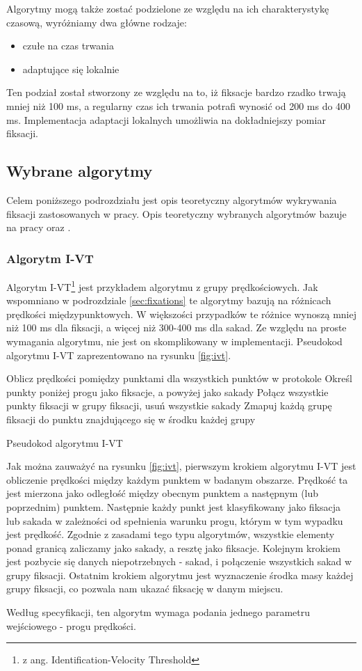 Algorytmy mogą także zostać podzielone ze względu na ich charakterystykę czasową, wyróżniamy dwa główne rodzaje:
\begin{itemize}
    \item czułe na czas trwania
    \item adaptujące się lokalnie
\end{itemize}
Ten podział został stworzony ze względu na to, iż fiksacje bardzo rzadko trwają mniej niż 100 ms, a regularny czas ich trwania potrafi wynosić od 200 ms do 400 ms. Implementacja adaptacji lokalnych umożliwia na dokładniejszy pomiar fiksacji.
\subsection{Wybrane algorytmy}
\label{ssec:algorithms}
Celem poniższego podrozdziału jest opis teoretyczny algorytmów wykrywania fiksacji zastosowanych w pracy. Opis teoretyczny wybranych algorytmów bazuje na pracy \cite{Main} oraz \cite{EvaluationMethodology}.
\subsubsection{Algorytm I-VT}
\label{ssec:ivt}
Algorytm I-VT\footnote{z ang. Identification-Velocity Threshold} jest przykładem algorytmu z grupy prędkościowych. Jak wspomniano w podrozdziale \ref{sec:fixations} te algorytmy bazują na różnicach prędkości międzypunktowych. W większości przypadków te różnice wynoszą mniej niż 100 ms dla fiksacji, a więcej niż 300-400 ms dla sakad. Ze względu na proste wymagania algorytmu, nie jest on skomplikowany w implementacji. Pseudokod algorytmu I-VT zaprezentowano na rysunku \ref{fig:ivt}.
{\begin{algorithm}[H]
    \SetAlgoLined
    Oblicz prędkości pomiędzy punktami dla wszystkich punktów w protokole\;
    Określ punkty poniżej progu jako fiksacje, a powyżej jako sakady\;
    Połącz wszystkie punkty fiksacji w grupy fiksacji, usuń wszystkie sakady\;
    Zmapuj każdą grupę fiksacji do punktu znajdującego się w środku każdej grupy\;
    \;
    \label{fig:ivt}
    \caption{Pseudokod algorytmu I-VT}
\end{algorithm}}
Jak można zauważyć na rysunku \ref{fig:ivt}, pierwszym krokiem algorytmu I-VT jest obliczenie prędkości między każdym punktem w badanym obszarze. Prędkość ta jest mierzona jako odległość między obecnym punktem a następnym (lub poprzednim) punktem. Następnie każdy punkt jest klasyfikowany jako fiksacja lub sakada w zależności od spełnienia warunku progu, którym w tym wypadku jest prędkość. Zgodnie z zasadami tego typu algorytmów, wszystkie elementy ponad granicą zaliczamy jako sakady, a resztę jako fiksacje. Kolejnym krokiem jest pozbycie się danych niepotrzebnych - sakad, i połączenie wszystkich sakad w grupy fiksacji. Ostatnim krokiem algorytmu jest wyznaczenie środka masy każdej grupy fiksacji, co pozwala nam ukazać fiksację w danym miejscu.\par
Według specyfikacji, ten algorytm wymaga podania jednego parametru wejściowego - progu prędkości.
